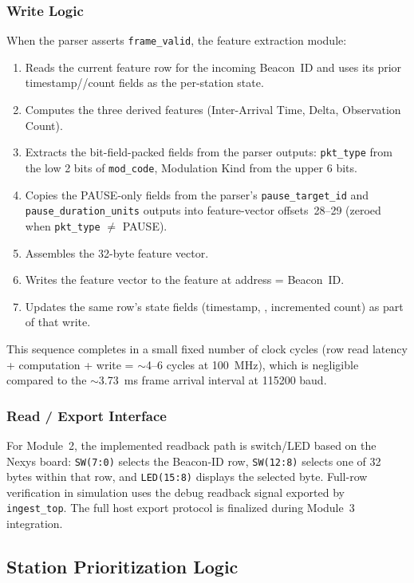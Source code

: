 \documentclass[11pt,letterpaper]{article}
\begin{document}
	\subsubsection{Write Logic}

	When the parser asserts \texttt{frame\_valid}, the feature extraction module:
	\begin{enumerate}[leftmargin=2em]
		\item Reads the current feature row for the incoming Beacon~ID and uses its prior timestamp/\RSSI{}/count fields as the per-station state.
		\item Computes the three derived features (Inter-Arrival Time, \RSSI{} Delta, Observation Count).
		\item Extracts the bit-field-packed fields from the parser outputs: \texttt{pkt\_type} from the low 2 bits of \texttt{mod\_code}, Modulation Kind from the upper 6 bits.
		\item Copies the PAUSE-only fields from the parser's \texttt{pause\_target\_id} and \texttt{pause\_duration\_units} outputs into feature-vector offsets~28--29 (zeroed when \texttt{pkt\_type} $\ne$ PAUSE).
		\item Assembles the 32-byte feature vector.
		\item Writes the feature vector to the feature \BRAM{} at address = Beacon~ID.
		\item Updates the same row's state fields (timestamp, \RSSI{}, incremented count) as part of that write.
	\end{enumerate}

	This sequence completes in a small fixed number of clock cycles (row read latency + computation + write = $\sim$4--6 cycles at 100~MHz), which is negligible compared to the $\sim$3.73~ms frame arrival interval at 115200 baud.

	\subsubsection{Read / Export Interface}

	For Module~2, the implemented readback path is switch/LED based on the Nexys board: \texttt{SW(7:0)} selects the Beacon-ID row, \texttt{SW(12:8)} selects one of 32 bytes within that row, and \texttt{LED(15:8)} displays the selected byte. Full-row verification in simulation uses the debug readback signal exported by \texttt{ingest\_top}. The full host export protocol is finalized during Module~3 integration.

	\subsection{Station Prioritization Logic}
\end{document}

